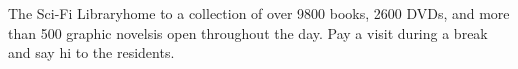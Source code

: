The Sci-Fi Library\textemdash home to a collection of over 9800 books,
2600 DVDs, and more than 500 graphic novels\textemdash is open
throughout the day. Pay a visit during a break and say hi to the
residents.
